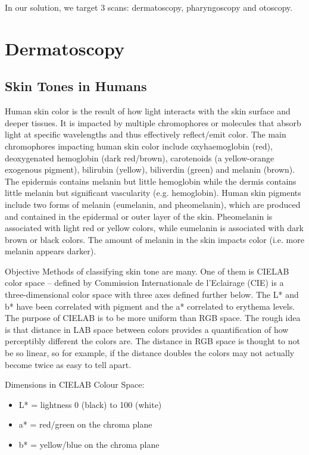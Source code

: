 In our solution, we target 3 scans: dermatoscopy, pharyngoscopy and otoscopy.

\section{Dermatoscopy}

\subsection{Skin Tones in Humans}

Human skin color is the result of how light interacts with the skin surface and deeper tissues. It is impacted by multiple chromophores or molecules that absorb light at specific wavelengths and thus effectively reflect/emit color. The main chromophores impacting human skin color include oxyhaemoglobin (red), deoxygenated hemoglobin (dark red/brown), carotenoids (a yellow-orange exogenous pigment), bilirubin (yellow), biliverdin (green) and melanin (brown). The epidermis contains melanin but little hemoglobin while the dermis contains little melanin but significant vascularity (e.g. hemoglobin). Human skin pigments include two forms of melanin (eumelanin, and pheomelanin), which are produced and contained in the epidermal or outer layer of the skin. Pheomelanin is associated with light red or yellow colors, while eumelanin is associated with dark brown or black colors. The amount of melanin in the skin impacts color (i.e. more melanin appears darker).~\cite{oxio} \par

Objective Methods of classifying skin tone are many. One of them is CIELAB color space – defined by Commission Internationale de l’Eclairage (CIE) is a three-dimensional color space with three axes defined further below. The L* and b* have been correlated with pigment and the a* correlated to erythema levels. The purpose of CIELAB is to be more uniform than RGB space. The rough idea is that distance in LAB space between colors provides a quantification of how perceptibly different the colors are. The distance in RGB space is thought to not be so linear, so for example, if the distance doubles the colors may not actually become twice as easy to tell apart. \cite{book}

Dimensions in CIELAB Colour Space:

\begin{itemize}
    \item L* = lightness 0 (black) to 100 (white)
    \item a* = red/green on the chroma plane
    \item b* = yellow/blue on the chroma plane
\end{itemize}

